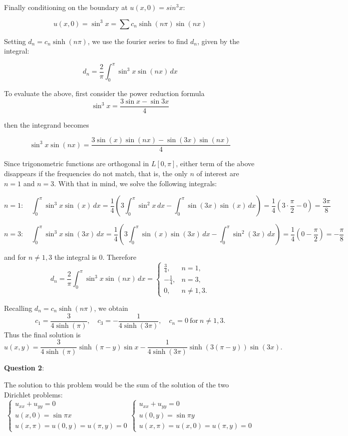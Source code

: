 \documentclass{article} %
\newcommand{\question}[2][]{
  \begin{flushleft}
    \textbf{Question #1}: \textit{#2}

\end{flushleft}}
\begin{document}
Finally conditioning on the boundary at $u(x,0) = sin^3x$:

\[
  u(x,0) = \sin^3x = \sum c_n \sinh(n\pi)\sin(nx)
\]

Setting $d_n = c_n \sinh(n\pi)$, we use the fourier series to find
$d_n$, given by the integral:

\[
  d_n = \frac{2}{\pi}\int_0^\pi \sin^3x\sin(nx)\,dx
\]

To evaluate the above, first consider the power reduction formula
\[
  \sin^3x = \frac{3\sin x - \sin 3x}{4}
\]

then the integrand becomes

$$
\sin^3x\sin(nx) = \frac{3\sin(x)\sin(nx) - \sin(3x)\sin(nx)}{4}
$$

Since trigonometric functions are orthogonal in $L[0,\pi]$, either
term of the above disappears if the frequencies do not match, that
is, the only $n$ of interest are $n = 1$ and $n = 3$. With that in
mind, we solve the following integrals:

\[
  n = 1:\quad \int_0^\pi \sin^3x\sin(x)\,dx
  = \frac{1}{4}\left(3\int_0^\pi \sin^2x\,dx
  - \int_0^\pi \sin(3x)\sin(x)\,dx\right)
  = \frac{1}{4}\left(3\cdot\frac{\pi}{2}-0\right)
  = \frac{3\pi}{8}
\]

\[
  n = 3:\quad \int_0^\pi \sin^3x\sin(3x)\,dx
  = \frac{1}{4}\left(3\int_0^\pi \sin(x)\sin(3x)\,dx
  - \int_0^\pi \sin^2(3x)\,dx\right)
  = \frac{1}{4}\left(0-\frac{\pi}{2}\right)
  = -\frac{\pi}{8}
\]

and for $n \ne 1,3$ the integral is $0$. Therefore
\[
  d_n = \frac{2}{\pi}\int_0^\pi \sin^3x\sin(nx)\,dx
  =
  \begin{cases}
    \frac{3}{4}, & n = 1,\\
    -\frac{1}{4}, & n = 3,\\
    0, & n \ne 1,3.
  \end{cases}
\]

Recalling $d_n = c_n \sinh(n\pi)$, we obtain
\[
  c_1 = \frac{3}{4\sinh(\pi)},\quad
  c_3 = -\frac{1}{4\sinh(3\pi)},\quad
  c_n = 0\ \text{for}\ n \ne 1,3.
\]
Thus the final solution is
\[
  u(x,y)
  = \frac{3}{4\sinh(\pi)}\sinh(\pi-y)\sin x
  - \frac{1}{4\sinh(3\pi)}\sinh(3(\pi-y))\sin(3x).
\]

\question[2]{}

The solution to this problem would be the sum of the solution of the
two Dirichlet problems:
$$
\begin{cases}
  u_{xx} + u_{yy} = 0 \\
  u(x,0) = \sin\pi x\\
  u(x,\pi) = u(0, y) = u(\pi, y) = 0
\end{cases}
\begin{cases}
  u_{xx} + u_{yy} = 0 \\
  u(0,y) = \sin\pi y\\
  u(x,\pi) = u(x, 0) = u(\pi, y) = 0
\end{cases}
$$
\end{document}
